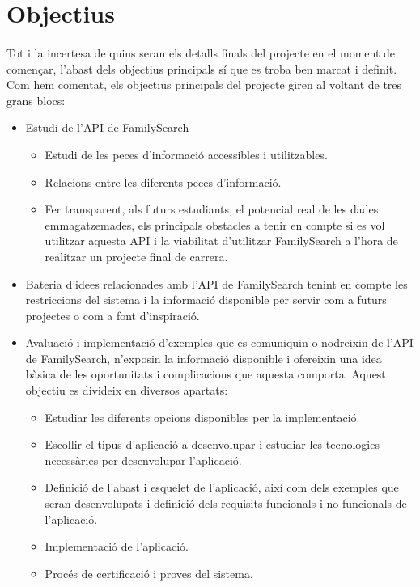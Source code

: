\section{Objectius}

    \paragraph{}
    Tot i la incertesa de quins seran els detalls finals del projecte en el moment de començar, l’abast dels objectius principals sí que es troba ben marcat i definit. Com hem comentat, els objectius principals del projecte giren al voltant de tres grans blocs:

    \begin{itemize}
        \item Estudi de l’\gls{API} de FamilySearch
        \begin{itemize}
            \item Estudi de les peces d’informació accessibles i utilitzables.
            \item Relacions entre les diferents peces d’informació.
            \item Fer transparent, als futurs estudiants, el potencial real de les dades emmagatzemades, els principals obstacles a tenir en compte si es vol utilitzar aquesta API i la viabilitat d’utilitzar FamilySearch a l’hora de realitzar un projecte final de carrera.
        \end{itemize}
        \item Bateria d'idees relacionades amb l’\gls{API} de FamilySearch tenint en compte les restriccions del sistema i la informació disponible per servir com a futurs projectes o com a font d'inspiració.
        \item Avaluació i implementació d’exemples que es comuniquin o nodreixin de l’\gls{API} de FamilySearch, n’exposin la informació disponible i ofereixin una idea bàsica de les oportunitats i complicacions que aquesta comporta. Aquest objectiu es divideix en diversos apartats:
        \begin{itemize}
            \item Estudiar les diferents opcions disponibles per la implementació.
            \item Escollir el tipus d’aplicació a desenvolupar i estudiar les tecnologies necessàries per desenvolupar l'aplicació.
            \item Definició de l’abast i esquelet de l’aplicació, així com dels exemples que seran desenvolupats i definició dels requisits funcionals i no funcionals de l'aplicació.
            \item Implementació de l’aplicació.
            \item Procés de certificació i proves del sistema.
        \end{itemize}
    \end{itemize}

